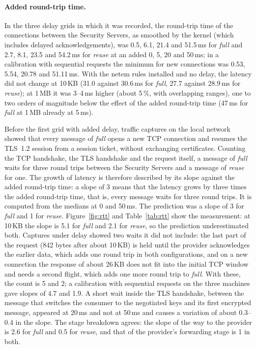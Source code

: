 \documentclass[conference,a4paper]{IEEEtran}
\begin{document}
\paragraph{Added round-trip time.} In the three delay grids in which it was recorded,
the round-trip time of the connections between the Security Servers, as smoothed by the kernel (which
includes delayed acknowledgements), was 0.5, 6.1, 21.4 and 51.5\,ms for \emph{full} and 2.7, 8.1,
23.5 and 54.2\,ms for \emph{reuse} at an added 0, 5, 20 and 50\,ms; in a calibration with sequential
requests the minimum for new connections was 0.53, 5.54, 20.78 and 51.11\,ms. With the netem rules installed and no delay, the latency did not change at
10\,KB (31.0 against 30.6\,ms for \emph{full}, 27.7 against 28.9\,ms for \emph{reuse}); at 1\,MB it
was 3--4\,ms higher (about 5\,\%, with overlapping ranges), one to two orders of magnitude below the
effect of the added round-trip time (47\,ms for \emph{full} at 1\,MB already at 5\,ms).

Before the first grid with added delay, traffic captures on the local network showed that every
message of \emph{full} opens a new TCP connection and resumes the TLS~1.2 session from a session
ticket, without exchanging certificates. Counting the TCP handshake, the TLS handshake and the
request itself, a message of \emph{full} waits for three round trips between the Security Servers
and a message of \emph{reuse} for one. The growth of latency is therefore described by its slope
against the added round-trip time: a slope of 3 means that the latency grows by three times the added
round-trip time, that is, every message waits for three round trips. It is computed from the medians at 0 and
50\,ms. The prediction was a slope of 3
for \emph{full} and 1 for \emph{reuse}. Figure~\ref{fig:rtt} and Table~\ref{tab:rtt} show the measurement: at 10\,KB the
slope is 5.1 for \emph{full} and 2.1 for \emph{reuse}, so the prediction underestimated both.
Captures under delay showed two waits it did not include: the last part of the request (842 bytes
after about 10\,KB) is held until the provider acknowledges the earlier data, which adds one round
trip in both configurations, and on a new connection the response of about 26\,KB does not fit into
the initial TCP window and needs a second flight, which adds one more round trip to \emph{full}. With
these, the count is 5 and 2; a calibration with sequential requests on the three machines gave
slopes of 4.7 and 1.9. A short wait inside the TLS handshake, between the message that switches the
consumer to the negotiated keys and its first encrypted message, appeared at 20\,ms and not at
50\,ms and causes a variation of about 0.3--0.4 in the slope. The stage breakdown agrees: the slope of
the way to the provider is 2.6 for \emph{full} and 0.5 for \emph{reuse}, and that of the provider's
forwarding stage is 1 in both.
\end{document}
